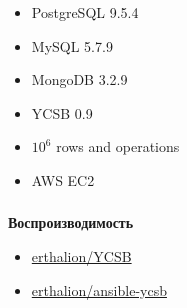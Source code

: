 \documentclass[usenames,dvipsnames, 18pt, compress, aspectratio=169]{beamer}
\begin{document}
%
\begin{frame}
    \frametitle{}
\end{frame}

\begin{frame}
    \frametitle{}
    \begin{center}
        \begin{itemize}[label={}]
            \item PostgreSQL 9.5.4
            \item MySQL 5.7.9
            \item MongoDB 3.2.9
            \item YCSB 0.9
            \item $10^6$ rows and operations
            \item AWS EC2
        \end{itemize}
    \end{center}
\end{frame}

\begin{frame}
    \frametitle{}
    \begin{center}
        \textbf{Воспроизводимость}
        \begin{itemize}[label={}]
            \item \href{https://github.com/erthalion/YCSB}{erthalion/YCSB}
            \item \href{https://github.com/erthalion/ansible-ycsb}{erthalion/ansible-ycsb}
        \end{itemize}
    \end{center}
\end{frame}
\end{document}
